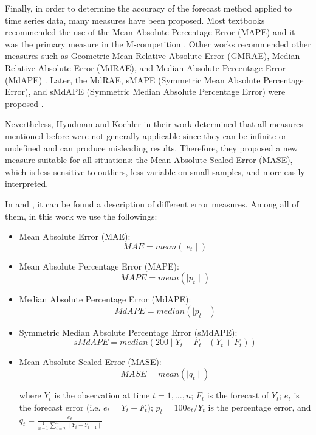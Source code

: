 \documentclass[preprint,authoryear,12pt]{elsarticle}
\begin{document}
Finally, in order to determine the accuracy of the forecast method applied to time series data, many measures have been proposed. Most textbooks recommended the use of the Mean Absolute Percentage Error (MAPE) \cite{Bowerman2004} and it was the primary measure in the M-competition \cite{Makridakis1982}. Other works recommended other measures such as Geometric Mean Relative Absolute Error (GMRAE), Median Relative Absolute Error (MdRAE), and Median Absolute Percentage Error (MdAPE) \cite{Armstrong,Fildes1992}. Later, the MdRAE, sMAPE (Symmetric Mean Absolute Percentage Error), and sMdAPE (Symmetric Median Absolute Percentage Error) were proposed \cite{Makridakis2000}.

Nevertheless, Hyndman and Koehler in their work \cite{Hyndman2006} determined that all measures mentioned before were not generally applicable since they can be infinite or undefined and can produce misleading results. Therefore, they proposed a new measure suitable for all situations: the Mean Absolute Scaled Error (MASE), which is less sensitive to outliers, less variable on small samples, and more easily interpreted.

In \cite{Gooijer25years} and \cite{Hyndman2006}, it can be found a description of different error measures. Among all of them, in this work we use the followings:

\begin{itemize}
  \item Mean Absolute Error (MAE):
        \begin{equation}\label{eq:MAE}
            MAE = mean(\mid e_t\mid)
        \end{equation}

  \item Mean Absolute Percentage Error (MAPE):
        \begin{equation}\label{eq:MAPE}
            MAPE = mean(\mid p_t\mid)
        \end{equation}

        \bigskip
  \item Median Absolute Percentage Error (MdAPE):
        \begin{equation}\label{eq:MDAPE}
            MdAPE = median(\mid p_t\mid)
        \end{equation}

  \item Symmetric Median Absolute Percentage Error (sMdAPE):
        \begin{equation}\label{eq:SMDAPE}
            sMdAPE = median(200\mid Y_t - F_t\mid (Y_t + F_t))
        \end{equation}

  \item Mean Absolute Scaled Error (MASE):
        \begin{equation}\label{eq:MASE}
            MASE = mean(\mid q_t\mid)
        \end{equation}

where $Y_t$ is the observation at time $t = {1,...,n}$; $F_t$ is the forecast of $Y_t$; $e_t$ is the forecast error (i.e. $e_t= Y_t - F_t$); $p_t = 100e_t/Y_t$ is the percentage error, and
         $q_t = \displaystyle\frac{e_t}{\displaystyle\frac{1}{n-1} \sum_{i=2}^n \mid Y_i - Y_{i-1} \mid }$
\end{itemize}
\end{document}
